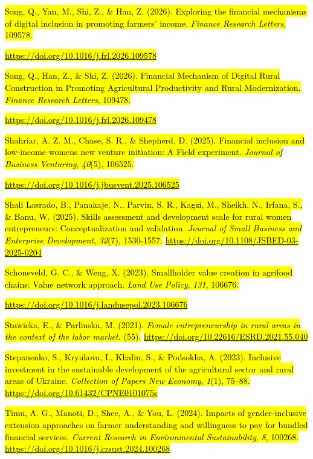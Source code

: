 \documentclass[
]{article}
\begin{document}
\hl{Song, Q., Yan, M., Shi, Z., \& Han, Z. (2026). Exploring the
financial mechanisms of digital inclusion in promoting farmers' income.
\emph{Finance Research Letters}, 109578.}

\href{https://doi.org/10.1016/j.frl.2026.109578}{\hl{https://doi.org/10.1016/j.frl.2026.109578}}

\hl{Song, Q., Han, Z., \& Shi, Z. (2026). Financial Mechanism of Digital
Rural Construction in Promoting Agricultural Productivity and Rural
Modernization. \emph{Finance Research Letters}, 109478.}

\href{https://doi.org/10.1016/j.frl.2026.109478}{\hl{https://doi.org/10.1016/j.frl.2026.109478}}

\hl{Shahriar, A. Z. M., Chase, S. R., \& Shepherd, D. (2025). Financial
inclusion and low-income women\textquotesingle s new venture initiation:
A Field experiment. \emph{Journal of Business Venturing}, \emph{40}(5),
106525.}

\href{https://doi.org/10.1016/j.jbusvent.2025.106525}{\hl{https://doi.org/10.1016/j.jbusvent.2025.106525}}

\hl{Shali Lasrado, B., Panakaje, N., Parvin, S. R., Kagzi, M., Sheikh,
N., Irfana, S., \& Banu, W. (2025). Skills assessment and development
scale for rural women entrepreneurs: Conceptualization and validation.
\emph{Journal of Small Business and Enterprise Development},
\emph{32}(7), 1530-1557.}
\href{https://doi.org/10.1108/JSBED-03-2025-0204}{\hl{https://doi.org/10.1108/JSBED-03-2025-0204}}

\hl{Schoneveld, G. C., \& Weng, X. (2023). Smallholder value creation in
agrifood chains: Value network approach. \emph{Land Use Policy},
\emph{131}, 106676.}

\href{https://doi.org/10.1016/j.landusepol.2023.106676}{\hl{https://doi.org/10.1016/j.landusepol.2023.106676}}

\hl{Stawicka, E., \& Parlinska, M. (2021). \emph{Female entrepreneurship
in rural areas in the context of the labor market.} (55).}
\href{https://doi.org/10.22616/ESRD.2021.55.040}{\hl{https://doi.org/10.22616/ESRD.2021.55.040}}

\hl{Stepanenko, S., Kryukova, I., Khalin, S., \& Podsokha, A. (2023).
Inclusive investment in the sustainable development of the agricultural
sector and rural areas of Ukraine. \emph{Collection of Papers New
Economy}, \emph{1}(1), 75--88.}
\href{https://doi.org/10.61432/CPNE0101075s}{\hl{https://doi.org/10.61432/CPNE0101075s}}

\hl{Timu, A. G., Manoti, D., Shee, A., \& You, L. (2024). Impacts of
gender-inclusive extension approaches on farmer understanding and
willingness to pay for bundled financial services. \emph{Current
Research in Environmental Sustainability}, \emph{8}, 100268.
\mbox{\url{https://doi.org/10.1016/j.crsust.2024.100268}}}
\end{document}

